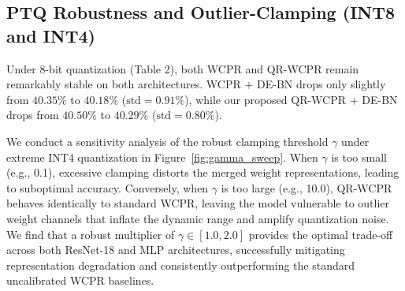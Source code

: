 \documentclass{article}
\theoremstyle{plain}
\theoremstyle{definition}
\theoremstyle{remark}
\begin{document}
\subsection{PTQ Robustness and Outlier-Clamping (INT8 and INT4)}
Under 8-bit quantization (Table 2), both WCPR and QR-WCPR remain remarkably stable on both architectures. WCPR + DE-BN drops only slightly from $40.35\%$ to $40.18\%$ ($\text{std}=0.91\%$), while our proposed QR-WCPR + DE-BN drops from $40.50\%$ to $40.29\%$ ($\text{std}=0.80\%$).

We conduct a sensitivity analysis of the robust clamping threshold $\gamma$ under extreme INT4 quantization in Figure~\ref{fig:gamma_sweep}. When $\gamma$ is too small (e.g., 0.1), excessive clamping distorts the merged weight representations, leading to suboptimal accuracy. Conversely, when $\gamma$ is too large (e.g., 10.0), QR-WCPR behaves identically to standard WCPR, leaving the model vulnerable to outlier weight channels that inflate the dynamic range and amplify quantization noise. We find that a robust multiplier of $\gamma \in [1.0, 2.0]$ provides the optimal trade-off across both ResNet-18 and MLP architectures, successfully mitigating representation degradation and consistently outperforming the standard uncalibrated WCPR baselines.
\end{document}
